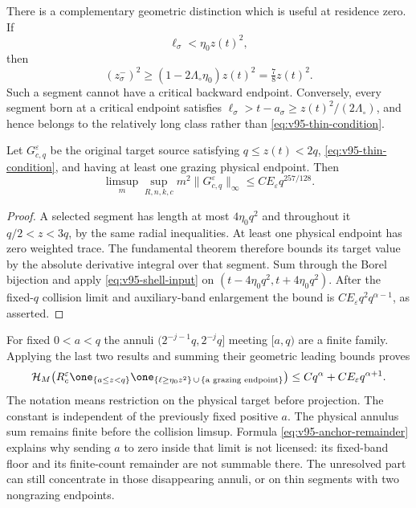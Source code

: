 There is a complementary geometric distinction which is useful at
residence zero. If
\begin{equation}\label{eq:v95-thin-condition}
                  \ell_\sigma<\eta_0 z(t)^2,
\end{equation}
then
\begin{equation}\label{eq:v95-thin-inlet}
 (z_\sigma^-)^2\ge(1-2\Lambda_\circ\eta_0)z(t)^2
                       =\tfrac78z(t)^2.
\end{equation}
Such a segment cannot have a critical backward endpoint. Conversely,
every segment born at a critical endpoint satisfies
$\ell_\sigma>t-a_\sigma\ge z(t)^2/(2\Lambda_\circ)$,
and hence belongs to the relatively long class rather than
\eqref{eq:v95-thin-condition}.

\begin{proposition}
\label{prop:v95-thin-grazing}
Let $G_{c,q}^\varepsilon$ be the original target source satisfying
$q\le z(t)<2q$, \eqref{eq:v95-thin-condition}, and having at least
one grazing physical endpoint. Then
\begin{equation}\label{eq:v95-thin-grazing}
 \limsup_m\sup_{R,n,k,c}m^2\|G_{c,q}^\varepsilon\|_\infty
                   \le C E_\varepsilon q^{257/128}.
\end{equation}
\end{proposition}
\begin{proof}
A selected segment has length at most $4\eta_0q^2$ and throughout
it $q/2<z<3q$, by the same radial inequalities. At least one
physical endpoint has zero weighted trace. The fundamental theorem
therefore bounds its target value by the absolute derivative integral
over that segment. Sum through the Borel bijection and apply
\eqref{eq:v95-shell-input} on
$(t-4\eta_0q^2,t+4\eta_0q^2)$. After the fixed-$q$ collision
limit and auxiliary-band enlargement the bound is
$C E_\varepsilon q^2q^{\alpha-1}$, as asserted.
\end{proof}

For fixed $0<a<q$ the annuli $(2^{-j-1}q,2^{-j}q]$ meeting
$[a,q)$ are a finite family. Applying the last two results and
summing their geometric leading bounds proves
\begin{equation}\label{eq:v95-core-positive-cutoff}
 \mathcal H_M\!\left(
 R_c^\varepsilon\one_{\{a\le z<q\}}
 \one_{\{\ell\ge\eta_0z^2\}\,\cup\,\{\text{a grazing endpoint}\}}
                      \right)
 \le Cq^\alpha+C E_\varepsilon q^{\alpha+1}.
\end{equation}
The notation means restriction on the physical target before
projection. The constant is independent of the previously fixed
positive $a$. The physical annulus sum remains finite before the
collision limsup. Formula \eqref{eq:v95-anchor-remainder} explains
why sending $a$ to zero inside that limit is not licensed: its
fixed-band floor and its finite-count remainder are not summable
there. The unresolved part can still concentrate in those disappearing
annuli, or on thin segments with two nongrazing endpoints.

